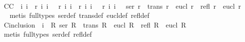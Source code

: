 \begin{isabellebody}
%
\isanewline
%
\isanewline
%
\isadelimproof
\ %
\endisadelimproof
%
\isatagproof
{}\isamarkupfalse%
%
\endisatagproof
{\isafoldproof}%
%
\isadelimproof
\isanewline
%
\endisadelimproof
{}\isamarkupfalse%
\ C{}{}{\isacharunderscore}C{\isacharcolon}\ {\isachardoublequoteopen}{\isacharhash}\ i{}\ i{}\ {\isasymand}\ r\ i{}\ i{}\ {\isasymand}\ {\isasymnot}\ r\ i{}\ i{}\ {\isasymand}\ r\ i{}\ i{}\ {\isasymand}\ {\isasymnot}\ r\ i{}\ i{}\ {\isasymlongrightarrow}\ {\isasymnot}\ {\isacharparenleft}ser\ r\ {\isasymand}\ trans\ r\ {\isasymand}\ eucl\ r\ {\isasymlongrightarrow}\ {\isacharparenleft}refl\ r\ {\isasymand}\ eucl\ r{\isacharparenright}{\isacharparenright}{\isachardoublequoteclose}\ \isanewline
%
\isadelimproof
\ %
\endisadelimproof
%
\isatagproof
{}\isamarkupfalse%
\ {\isacharparenleft}metis\ {\isacharparenleft}full{\isacharunderscore}types{\isacharparenright}\ ser{\isacharunderscore}def\ trans{\isacharunderscore}def\ eucl{\isacharunderscore}def\ refl{\isacharunderscore}def{\isacharparenright}%
\endisatagproof
{\isafoldproof}%
%
\isadelimproof
\isanewline
%
\endisadelimproof
{}\isamarkupfalse%
\ C{}{}{\isacharunderscore}inclusion{\isacharcolon}\ {\isachardoublequoteopen}{\isacharhash}\ i{}\ {\isasymlongrightarrow}\ {\isacharparenleft}{\isasymforall}R{\isachardot}\ ser\ R\ {\isasymand}\ trans\ R\ {\isasymand}\ eucl\ R\ {\isasymlongrightarrow}\ {\isacharparenleft}refl\ R\ {\isasymand}\ eucl\ R{\isacharparenright}{\isacharparenright}{\isachardoublequoteclose}\isanewline
%
\isadelimproof
\ %
\endisadelimproof
%
\isatagproof
{}\isamarkupfalse%
\ {\isacharparenleft}metis\ {\isacharparenleft}full{\isacharunderscore}types{\isacharparenright}\ ser{\isacharunderscore}def\ refl{\isacharunderscore}def{\isacharparenright}%
\endisatagproof
{\isafoldproof}%
%
\isadelimproof
%
\endisadelimproof
%
\begin{isamarkuptext}%
\begin{isbfig}{7em}
\end{isbfig}
\end{isamarkuptext}
\end{isabellebody}
